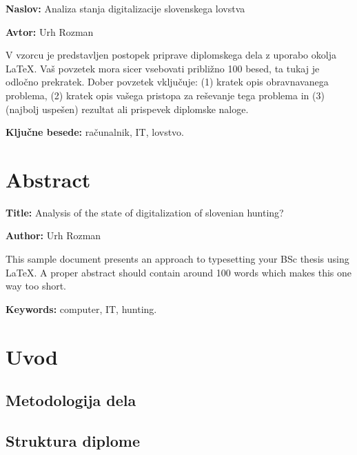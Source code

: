 \documentclass[a4paper,12pt,openright]{book}
\newcommand{\ttitle}{Analiza stanja digitalizacije slovenskega lovstva}
\newcommand{\ttitleEn}{Analysis of the state of digitalization of slovenian hunting?}
\newcommand{\tauthor}{Urh Rozman}
\newcommand{\tkeywords}{računalnik, IT, lovstvo}
\newcommand{\tkeywordsEn}{computer, IT, hunting}
\newcommand{\clearemptydoublepage}{\newpage{\pagestyle{empty}\cleardoublepage}}
\begin{document}
\noindent\textbf{Naslov:} \ttitle
\bigskip

\noindent\textbf{Avtor:} \tauthor
\bigskip

\noindent V vzorcu je predstavljen postopek priprave diplomskega dela z uporabo okolja \LaTeX. Vaš povzetek mora sicer vsebovati približno 100 besed, ta tukaj je odločno prekratek.
Dober povzetek vključuje: (1) kratek opis obravnavanega problema, (2) kratek opis vašega pristopa za reševanje tega problema in (3) (najbolj uspešen) rezultat ali prispevek diplomske naloge.

\bigskip

\noindent\textbf{Ključne besede:} \tkeywords.
\clearemptydoublepage

\chapter*{Abstract}

\noindent\textbf{Title:} \ttitleEn
\bigskip

\noindent\textbf{Author:} \tauthor
\bigskip

\noindent This sample document presents an approach to typesetting your BSc thesis using \LaTeX. 
A proper abstract should contain around 100 words which makes this one way too short.
\bigskip

\noindent\textbf{Keywords:} \tkeywordsEn.
\clearemptydoublepage

\mainmatter
\setcounter{page}{1}
\pagestyle{fancy}



\chapter{Uvod}
\label{start}

\section{Metodologija dela}

\section{Struktura diplome}
\end{document}
